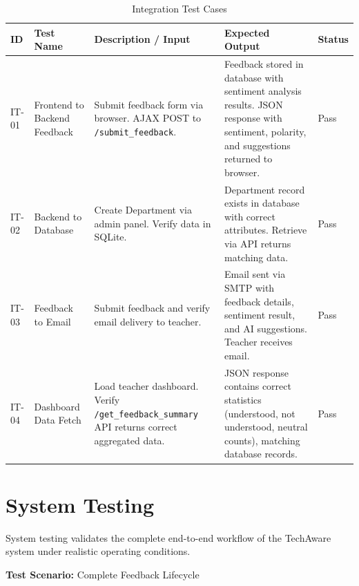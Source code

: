 \begin{table}[H]
\centering
\caption{Integration Test Cases}
\begin{tabularx}{\textwidth}{|p{1.3cm}|p{2.5cm}|X|p{2.5cm}|p{1.2cm}|}
\hline
\textbf{ID} & \textbf{Test Name} & \textbf{Description / Input} & \textbf{Expected Output} & \textbf{Status} \\
\hline
IT-01 & Frontend to Backend Feedback & Submit feedback form via browser. AJAX POST to \texttt{/submit\_feedback}. & Feedback stored in database with sentiment analysis results. JSON response with sentiment, polarity, and suggestions returned to browser. & Pass \\
\hline
IT-02 & Backend to Database & Create Department via admin panel. Verify data in SQLite. & Department record exists in database with correct attributes. Retrieve via API returns matching data. & Pass \\
\hline
IT-03 & Feedback to Email & Submit feedback and verify email delivery to teacher. & Email sent via SMTP with feedback details, sentiment result, and AI suggestions. Teacher receives email. & Pass \\
\hline
IT-04 & Dashboard Data Fetch & Load teacher dashboard. Verify \texttt{/get\_feedback\_summary} API returns correct aggregated data. & JSON response contains correct statistics (understood, not understood, neutral counts), matching database records. & Pass \\
\hline
\end{tabularx}
\end{table}

\section{System Testing}

System testing validates the complete end-to-end workflow of the TechAware system under realistic operating conditions.

\textbf{Test Scenario:} Complete Feedback Lifecycle

